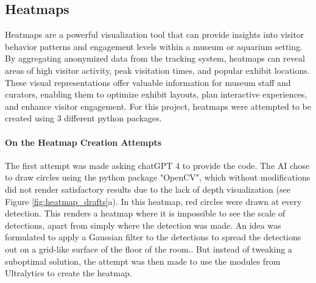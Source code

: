 \subsection{Heatmaps}
\label{sec:heatmaps}
Heatmaps are a powerful visualization tool that can provide insights into visitor behavior patterns and engagement levels within a museum or aquarium setting. By aggregating anonymized data from the tracking system, heatmaps can reveal areas of high visitor activity, peak visitation times, and popular exhibit locations. These visual representations offer valuable information for museum staff and curators, enabling them to optimize exhibit layouts, plan interactive experiences, and enhance visitor engagement. For this project, heatmaps were attempted to be created using 3 different python packages.

\paragraph{On the Heatmap Creation Attempts}
The first attempt was made asking chatGPT 4 to provide the code. The AI chose to draw circles using the python package "OpenCV", which without modifications did not render satisfactory results due to the lack of depth visualization (see Figure \ref{fig:heatmap_drafts}a). In this heatmap, red circles were drawn at every detection. This renders a heatmap where it is impossible to see the scale of detections, apart from simply where the detection was made. An idea was formulated to apply a Gaussian filter to the detections to spread the detections out on a grid-like surface of the floor of the room.. But instead of tweaking a suboptimal solution, the attempt was then made to use the modules from Ultralytics to create the heatmap. 

